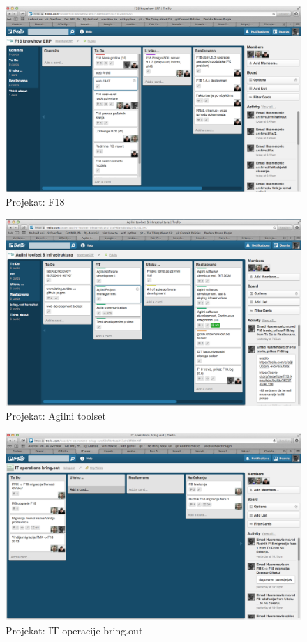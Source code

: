\documentclass[times, utf8, seminar]{fit}
\begin{document}
\begin{itemize}
\begin{figure}[H]
\centering
\includegraphics[width=14cm]{img/trello_f18.png}
\caption{Projekat: F18}
\end{figure}

\begin{figure}[H]
\centering
\includegraphics[width=14cm]{img/trello_agile.png}
\caption{Projekat: Agilni toolset}
\end{figure}

\begin{figure}[H]
\centering
\includegraphics[width=14cm]{img/trello_ops.png}
\caption{Projekat: IT operacije bring.out}
\end{figure}


\end{itemize}
\end{document}
